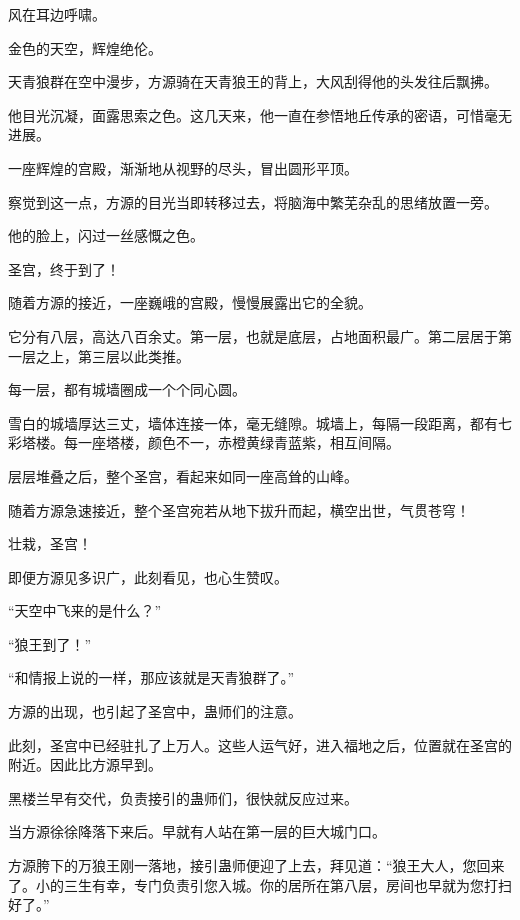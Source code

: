 
\begin{this_body}



风在耳边呼啸。

金色的天空，辉煌绝伦。

天青狼群在空中漫步，方源骑在天青狼王的背上，大风刮得他的头发往后飘拂。

他目光沉凝，面露思索之色。这几天来，他一直在参悟地丘传承的密语，可惜毫无进展。

一座辉煌的宫殿，渐渐地从视野的尽头，冒出圆形平顶。

察觉到这一点，方源的目光当即转移过去，将脑海中繁芜杂乱的思绪放置一旁。

他的脸上，闪过一丝感慨之色。

圣宫，终于到了！

随着方源的接近，一座巍峨的宫殿，慢慢展露出它的全貌。

它分有八层，高达八百余丈。第一层，也就是底层，占地面积最广。第二层居于第一层之上，第三层以此类推。

每一层，都有城墙圈成一个个同心圆。

雪白的城墙厚达三丈，墙体连接一体，毫无缝隙。城墙上，每隔一段距离，都有七彩塔楼。每一座塔楼，颜色不一，赤橙黄绿青蓝紫，相互间隔。

层层堆叠之后，整个圣宫，看起来如同一座高耸的山峰。

随着方源急速接近，整个圣宫宛若从地下拔升而起，横空出世，气贯苍穹！

壮栽，圣宫！

即便方源见多识广，此刻看见，也心生赞叹。

“天空中飞来的是什么？”

“狼王到了！”

“和情报上说的一样，那应该就是天青狼群了。”

方源的出现，也引起了圣宫中，蛊师们的注意。

此刻，圣宫中已经驻扎了上万人。这些人运气好，进入福地之后，位置就在圣宫的附近。因此比方源早到。

黑楼兰早有交代，负责接引的蛊师们，很快就反应过来。

当方源徐徐降落下来后。早就有人站在第一层的巨大城门口。

方源胯下的万狼王刚一落地，接引蛊师便迎了上去，拜见道：“狼王大人，您回来了。小的三生有幸，专门负责引您入城。你的居所在第八层，房间也早就为您打扫好了。”


\end{this_body}
